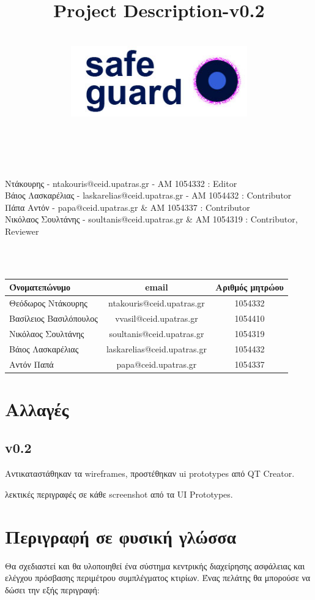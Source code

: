 \documentclass{article}
\title{Project Description-v0.2}
\author{\\
\includegraphics[width=3in]{safeguard}\\[1ex]\\\\
}
\begin{document}
\maketitle

\newpage


 Ντάκουρης - ntakouris@ceid.upatras.gr - ΑΜ 1054332 : Editor \\ 
Βάιος Λασκαρέλιας - laskarelias@ceid.upatras.gr - ΑΜ 1054432 : Contributor  \\
Πάπα Αντόν - papa@ceid.upatras.gr & AM 1054337 : Contributor \\
Νικόλαος Σουλτάνης - soultanis@ceid.upatras.gr & AM 1054319 : Contributor, Reviewer

\\
\\



\begin{tabular}{|l|c|c|}
\hline
Όνοματεπώνυμο & email & Αριθμός μητρώου  \\
\hline
Θεόδωρος Ντάκουρης & ntakouris@ceid.upatras.gr & 1054332 \\
Βασίλειος Βασιλόπουλος & vvasil@ceid.upatras.gr &  1054410 \\
Νικόλαος Σουλτάνης & soultanis@ceid.upatras.gr & 1054319  \\
Βάιος Λασκαρέλιας & laskarelias@ceid.upatras.gr & 1054432 \\
Αντόν Παπά & papa@ceid.upatras.gr & 1054337 \\
\hline
\end{tabular}

\renewcommand{\contentsname}{Περιεχόμενα}
\tableofcontents

\section{Αλλαγές}
\subsection{v0.2}
Αντικαταστάθηκαν τα wireframes, προστέθηκαν ui prototypes από QT Creator.

 λεκτικές περιγραφές σε κάθε screenshot από τα UI Prototypes.

\section{Περιγραφή σε φυσική γλώσσα}
Θα σχεδιαστεί και θα υλοποιηθεί ένα σύστημα κεντρικής διαχείρησης ασφάλειας και ελέγχου πρόσβασης περιμέτρου συμπλέγματος κτιρίων. Ένας πελάτης θα μπορούσε να δώσει την εξής περιγραφή:
\end{document}
